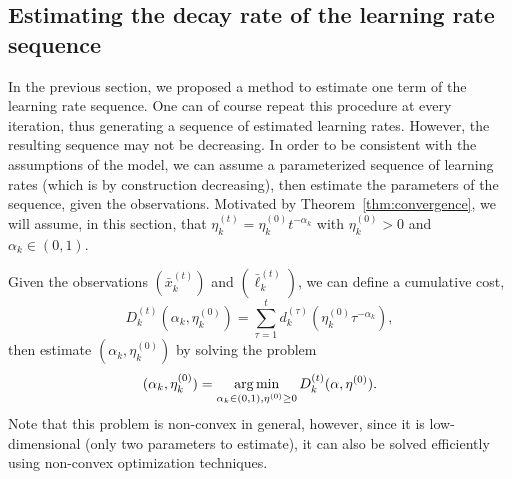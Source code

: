 \documentclass{sig-alternate-ipsn13}
\begin{document}
\subsection{Estimating the decay rate of the learning rate sequence}
In the previous section, we proposed a method to estimate one term of the learning rate sequence. One can of course repeat this procedure at every iteration, thus generating a sequence of estimated learning rates. However, the resulting sequence may not be decreasing. In order to be consistent with the assumptions of the model, we can assume a parameterized sequence of learning rates (which is by construction decreasing), then estimate the parameters of the sequence, given the observations. Motivated by Theorem~\ref{thm:convergence}, we will assume, in this section, that $\eta^{(t)}_k = \eta^{(0)}_k t^{-\alpha_k}$ with $\eta^{(0)}_k > 0$ and $\alpha_k \in (0, 1)$.

Given the observations $(\bar x^{(t)}_k)$ and $(\bar \ell^{(t)}_k)$, we can define a cumulative cost,
\[
D^{(t)}_k(\alpha_k, \eta^{(0)}_k) = \sum_{\tau = 1}^t d_k^{(\tau)}(\eta_k^{(0)} \tau^{-\alpha_k}),
\]
then estimate $(\alpha_k, \eta^{(0)}_k)$ by solving the problem
\begin{equation}
\label{eq:estimation_alpha_eta0}
(\alpha_k, \eta^{(0)}_k) = \operatorname*{arg\,min}_{\alpha_k \in (0, 1), \eta^{(0)} \geq 0} D^{(t)}_k(\alpha, \eta^{(0)}).
\end{equation}
Note that this problem is non-convex in general, however, since it is low-dimensional (only two parameters to estimate), it can also be solved efficiently using non-convex optimization techniques.


\end{document}
